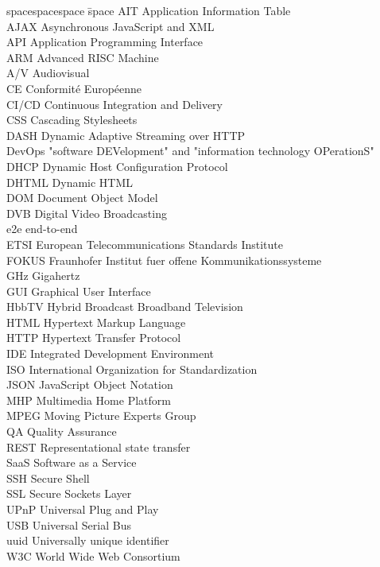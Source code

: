 
\begin{tabbing}
spacespacespace \= space \kill
AIT \> Application Information Table\\
AJAX \> Asynchronous JavaScript and XML\\
API \> Application Programming Interface\\
ARM \> Advanced RISC Machine\\
A/V \> Audiovisual\\
CE \> Conformité Européenne\\
CI/CD \> Continuous Integration and Delivery\\
CSS \> Cascading Stylesheets\\
DASH \> Dynamic Adaptive Streaming over HTTP\\
DevOps \> "software DEVelopment" and "information technology OPerationS"\\
DHCP \> Dynamic Host Configuration Protocol\\
DHTML \> Dynamic HTML\\
DOM \> Document Object Model\\
DVB \> Digital Video Broadcasting\\
e2e \> end-to-end\\
ETSI \> European Telecommunications Standards Institute\\
FOKUS \> Fraunhofer Institut fuer offene Kommunikationssysteme\\
GHz \> Gigahertz\\
GUI \> Graphical User Interface\\
HbbTV \> Hybrid Broadcast Broadband Television\\
HTML \> Hypertext Markup Language\\
HTTP \> Hypertext Transfer Protocol\\
IDE \> Integrated Development Environment\\
ISO \> International Organization for Standardization\\
JSON \> JavaScript Object Notation\\
MHP \> Multimedia Home Platform\\
MPEG \> Moving Picture Experts Group\\
QA \> Quality Assurance\\
REST \> Representational state transfer\\
SaaS \> Software as a Service\\
SSH \> Secure Shell\\
SSL \> Secure Sockets Layer\\
UPnP \> Universal Plug and Play\\
USB \> Universal Serial Bus\\
uuid \> Universally unique identifier\\
W3C \> World Wide Web Consortium\\
\end{tabbing}
\endinput
